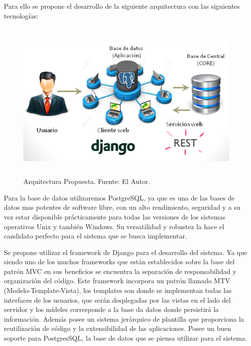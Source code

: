 Para ello se propone el desarrollo de la siguiente arquitectura con las siguientes tecnologías:

\newpage
\begin{figure}[H]
\begin{center}
	\includegraphics[width=15cm,height=8cm]{img/con_tecnologia1.png}
\end{center}
\caption{Arquitectura Propuesta. Fuente: El Autor.}
\label{fig:Con_Tec_propuesta}
\end{figure}

Para la base de datos utilizaremos PostgreSQL, ya que es una de las bases de datos mas potentes de software libre, con un alto rendimiento, seguridad y a su vez estar disponible prácticamente para todas las versiones de los sistemas operativos Unix y también Windows. Su versatilidad y robustez la hace el candidato perfecto para el sistema que se busca implementar.

Se propone utilizar el framework de Django para el desarrollo del sistema. Ya que siendo uno de los muchos frameworks que están establecidos sobre la base del patrón MVC en sus beneficios se encuentra la separación de responsabilidad y organización del código. Este framework incorpora un patrón llamado MTV (Modelo-Template-Vista), los templates son donde se implementan todas las interfaces de los usuarios, que serán desplegadas por las vistas en el lado del servidor y los mídeles corresponde a la base da datos donde persistirá la información. Además posee un sistema jerárquico de plantilla que proporciona la reutilización de código y la extensibilidad de las aplicaciones. Posee un buen soporte para PostgresSQL, la base de datos que se piensa utilizar para el sistema. 



